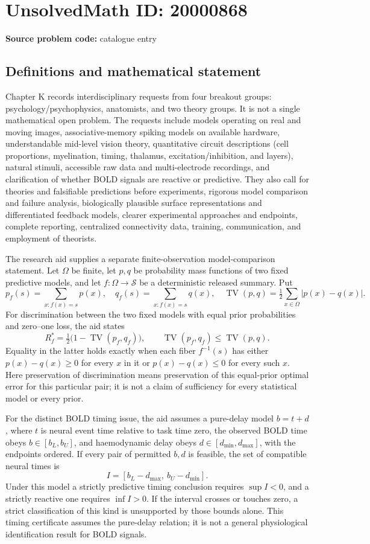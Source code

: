 \documentclass[11pt]{article}
\begin{document}
\section*{UnsolvedMath ID: 20000868}
\textbf{Source problem code:} catalogue entry
\subsection{Definitions and mathematical statement}
Chapter K records interdisciplinary requests from four breakout groups: psychology/psychophysics, anatomists, and two theory groups. It is not a single mathematical open problem. The requests include models operating on real and moving images, associative-memory spiking models on available hardware, understandable mid-level vision theory, quantitative circuit descriptions (cell proportions, myelination, timing, thalamus, excitation/inhibition, and layers), natural stimuli, accessible raw data and multi-electrode recordings, and clarification of whether BOLD signals are reactive or predictive. They also call for theories and falsifiable predictions before experiments, rigorous model comparison and failure analysis, biologically plausible surface representations and differentiated feedback models, clearer experimental approaches and endpoints, complete reporting, centralized connectivity data, training, communication, and employment of theorists.

The research aid supplies a separate finite-observation model-comparison statement. Let $\Omega$ be finite, let $p,q$ be probability mass functions of two fixed predictive models, and let $f:\Omega\to\mathcal S$ be a deterministic released summary. Put
\[
 p_f(s)=\sum_{x:f(x)=s}p(x),\quad q_f(s)=\sum_{x:f(x)=s}q(x),\quad
 \operatorname{TV}(p,q)=\tfrac12\sum_{x\in\Omega}|p(x)-q(x)|.
\]
For discrimination between the two fixed models with equal prior probabilities and zero--one loss, the aid states
\[
 R_f^*=\tfrac12\bigl(1-\operatorname{TV}(p_f,q_f)\bigr),\qquad
 \operatorname{TV}(p_f,q_f)\leq\operatorname{TV}(p,q).
\]
Equality in the latter holds exactly when each fiber $f^{-1}(s)$ has either $p(x)-q(x)\geq0$ for every $x$ in it or $p(x)-q(x)\leq0$ for every such $x$. Here preservation of discrimination means preservation of this equal-prior optimal error for this particular pair; it is not a claim of sufficiency for every statistical model or every prior.

For the distinct BOLD timing issue, the aid assumes a pure-delay model $b=t+d$, where $t$ is neural event time relative to task time zero, the observed BOLD time obeys $b\in[b_L,b_U]$, and haemodynamic delay obeys $d\in[d_{\min},d_{\max}]$, with the endpoints ordered. If every pair of permitted $b,d$ is feasible, the set of compatible neural times is
\[
 I=[b_L-d_{\max},\ b_U-d_{\min}].
\]
Under this model a strictly predictive timing conclusion requires $\sup I<0$, and a strictly reactive one requires $\inf I>0$. If the interval crosses or touches zero, a strict classification of this kind is unsupported by those bounds alone. This timing certificate assumes the pure-delay relation; it is not a general physiological identification result for BOLD signals.
\end{document}

